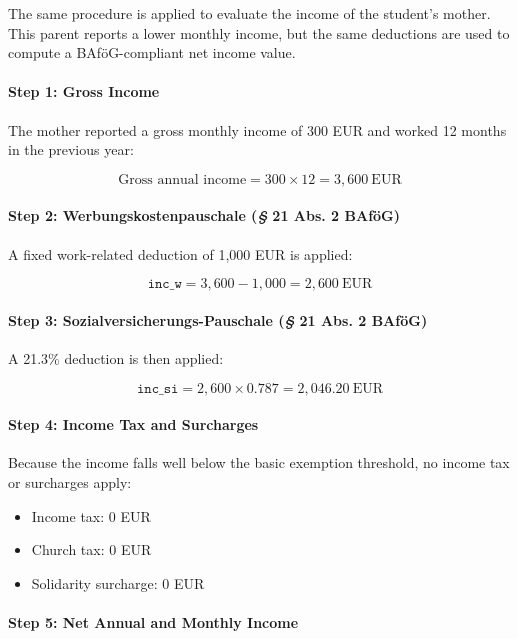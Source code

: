 The same procedure is applied to evaluate the income of the student’s mother. This parent reports a lower monthly income, but the same deductions are used to compute a BAföG-compliant net income value.

\paragraph{Step 1: Gross Income}

The mother reported a gross monthly income of 300 EUR and worked 12 months in the previous year:

\[
\text{Gross annual income} = 300 \times 12 = 3{,}600~\text{EUR}
\]

\paragraph{Step 2: Werbungskostenpauschale (\textit{§} 21 Abs. 2 BAföG)}

A fixed work-related deduction of 1,000 EUR is applied:

\[
\texttt{inc\_w} = 3{,}600 - 1{,}000 = 2{,}600~\text{EUR}
\]

\paragraph{Step 3: Sozialversicherungs-Pauschale (\textit{§} 21 Abs. 2 BAföG)}

A 21.3\% deduction is then applied:

\[
\texttt{inc\_si} = 2{,}600 \times 0.787 = 2{,}046.20~\text{EUR}
\]

\paragraph{Step 4: Income Tax and Surcharges}

Because the income falls well below the basic exemption threshold, no income tax or surcharges apply:
\begin{itemize}
    \item Income tax: 0 EUR
    \item Church tax: 0 EUR
    \item Solidarity surcharge: 0 EUR
\end{itemize}



\paragraph{Step 5: Net Annual and Monthly Income}

